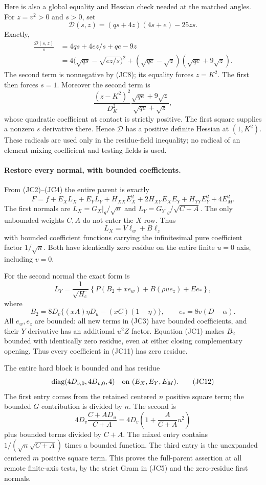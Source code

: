 Here is also a global equality and Hessian check needed at the
matched angles.  For $z=v^2>0$ and $s>0$, set
\[
 \mathcal D(s,z)=(q s+4z)(4s+e)-25zs.
\]
Exactly,
\begin{align*}
 \frac{\mathcal D(s,z)}s
 &=4qs+4ez/s+qe-9z\\
 &=4\bigl(\sqrt{qs}-\sqrt{ez/s}\bigr)^2
       +(\sqrt{qe}-\sqrt z)(\sqrt{qe}+9\sqrt z).    \tag{JC9}
\end{align*}
The second term is nonnegative by (JC8); its equality forces
$z=K^2$.  The first then forces $s=1$.  Moreover the second term is
\[
 \frac{(z-K^2)^2}{D_K^2}
       \frac{\sqrt{qe}+9\sqrt z}{\sqrt{qe}+\sqrt z},
\]
whose quadratic coefficient at contact is strictly positive.
The first square supplies a nonzero $s$ derivative there.
Hence $\mathcal D$ has a positive definite Hessian at $(1,K^2)$.
These radicals are used only in the residue-field inequality; no
radical of an element mixing coefficient and testing fields is used.

\paragraph{Restore every normal, with bounded coefficients.}
From (JC2)--(JC4) the entire parent is exactly
\[
 F=f+E_XL_X+E_YL_Y+
 H_{XX}E_X^2+2H_{XY}E_XE_Y+H_{YY}E_Y^2+4E_M^2.        \tag{JC10}
\]
The first normals are $L_X=G_X|_g/\sqrt n$ and
$L_Y=G_Y|_g/\sqrt{C+A}$.  The only unbounded weights $C,A$ do not
enter the $X$ row.  Thus
\[
 L_X=V\ell_w+B\ell_z
\]
with bounded coefficient functions carrying the infinitesimal
pure coefficient factor $1/\sqrt n$.  Both have identically zero
residue on the entire finite $u=0$ axis, including $v=0$.

For the second normal the exact form is
\[
 L_Y=\frac1{\sqrt{H_c}}\left\{
 P(B_2+xe_w)+B(\rho u e_z)+E e_*\right\},            \tag{JC11}
\]
where
\[
 B_2=8D_v\{(xA)\eta D_u-(xC)(1-\eta)\},\qquad
 e_*=8v(D-\alpha).
\]
All $e_w,e_z$ are bounded: all new terms in (JC3) have bounded
coefficients, and their $Y$ derivative has an additional $u^2Z$
factor.  Equation (JC1) makes $B_2$ bounded with identically zero
residue, even at either closing complementary opening.  Thus every
coefficient in (JC11) has zero residue.

The entire hard block is bounded and has residue
\[
             \operatorname{diag}(4D_{v,0},4D_{v,0},4)
                   \quad\hbox{on }(E_X,E_Y,E_M).      \tag{JC12}
\]
The first entry comes from the retained centered $n$ positive square term;
the bounded $G$ contribution is divided by $n$.  The second is
\[
 4D_v\frac{C+AD_u}{C+A}
   =4D_v\left(1+\frac A{C+A}u^2\right)
\]
plus bounded terms divided by $C+A$.  The mixed entry contains
$1/(\sqrt n\sqrt{C+A})$ times a bounded function.  The third
entry is the unexpanded centered $m$ positive square term.  This proves the
full-parent assertion at all remote finite-axis tests, by the
strict Gram in (JC5) and the zero-residue first normals.

